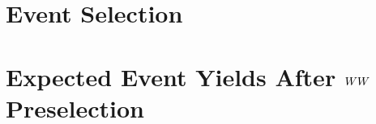 \documentclass{cmspaper}
\begin{document}
\section{Event Selection}
  \label{sec:selection} 
  

\section{Expected Event Yields After $WW$ Preselection}
  \label{sec:yields}
\end{document}
